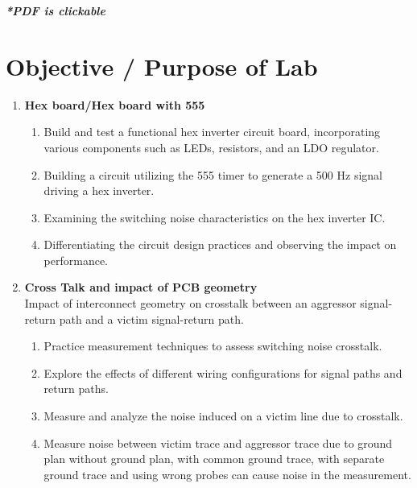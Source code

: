 \documentclass[a4paper,11pt]{article}%
\begin{document}


\pagebreak

\tableofcontents
\listoffigures
\listoftables
\vfill
\begin{center}
	\textbf{\textit{*PDF is clickable}}
\end{center}

\pagebreak

\section{Objective / Purpose of Lab}

\begin{enumerate}
	\item \textbf{Hex board/Hex board with 555}
	\begin{enumerate}
		\item 
		Build and test a functional hex inverter circuit board, incorporating various components such as LEDs, resistors, and an LDO regulator.
		\item 
		Building a circuit utilizing the 555 timer to generate a 500 Hz signal driving a hex inverter.
		\item 
		Examining the switching noise characteristics on the hex inverter IC.
		\item 
		Differentiating the circuit design practices and observing the impact on performance.
	\end{enumerate}
	\item \textbf{Cross Talk and impact of PCB geometry}\\ 
	Impact of interconnect geometry on crosstalk between an aggressor signal-return path and a victim signal-return path.
	\begin{enumerate}
		\item 
		Practice measurement techniques to assess switching noise crosstalk.
		\item Explore the effects of different wiring configurations for signal paths and return paths.
		\item Measure and analyze the noise induced on a victim line due to crosstalk.
		\item Measure noise between victim trace and aggressor trace due to ground plan without ground plan, with common ground trace, with separate ground trace and using wrong probes can cause noise in the measurement.
	\end{enumerate}
\end{enumerate}
\end{document}
